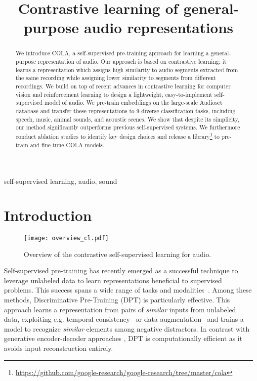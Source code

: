 \documentclass{article}
\title{Contrastive learning of general-purpose audio representations}
\begin{document}
\maketitle
\begin{abstract}
We introduce COLA, a self-supervised pre-training approach for learning a general-purpose representation of audio. Our approach is based on contrastive learning: it learns a representation which assigns high similarity to audio segments extracted from the same recording while assigning lower similarity to segments from different recordings. We build on top of recent advances in contrastive learning for computer vision and reinforcement learning to design a lightweight, easy-to-implement self-supervised model of audio. We pre-train embeddings on the large-scale Audioset database and transfer these representations to 9 diverse classification tasks, including speech, music, animal sounds, and acoustic scenes. We show that despite its simplicity, our method significantly outperforms previous self-supervised systems. We furthermore conduct ablation studies to identify key design choices and release a library\footnote{\scriptsize{\url{https://github.com/google-research/google-research/tree/master/cola}}} to pre-train and fine-tune COLA models.
\end{abstract}
\begin{keywords}
self-supervised learning, audio, sound
\end{keywords}
\section{Introduction}
\label{sec:intro}
\begin{figure*}[t]
\texttt{[image: overview\_cl.pdf]}
\caption{Overview of the contrastive self-supervised learning for audio.}
\label{fig:overview}
\end{figure*}

Self-supervised pre-training has recently emerged as a successful technique to leverage unlabeled data to learn representations beneficial to supervised problems. This success spans a wide range of tasks and modalities~\cite{grill2020bootstrap, oord2018representation, devlin2018bert, owens2018audio}.
Among these methods, Discriminative Pre-Training (DPT) is particularly effective. This approach learns a representation from pairs of \textit{similar} inputs from unlabeled data, exploiting e.g. temporal consistency~\cite{kawakami2020learning, owens2018audio, jansen2018unsupervised} or data augmentation~\cite{chen2020simple} and trains a model to recognize \textit{similar} elements among negative distractors. In contrast with generative encoder-decoder approaches \cite{chung2016audio, plchot2016audio, meyer2017unsupervised, wan2017google, pascual2019learning}, DPT is computationally efficient as it avoids input reconstruction entirely. 
\end{document}
